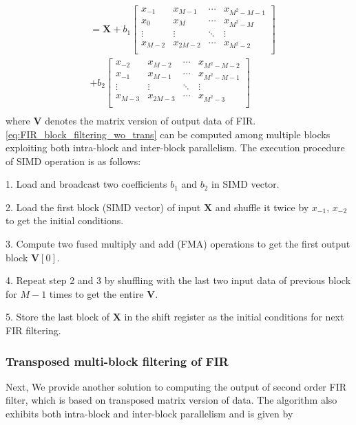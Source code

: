 \begin{equation}
\begin{aligned}
            &= \bm{X} + b_1\left[\begin{array}{c|c|c|c}
                x_{-1} & x_{M-1} & \cdots & x_{M^2-M-1} \\ 
                x_0 & x_M & \cdots & x_{M^2-M} \\
                \vdots & \vdots & \ddots & \vdots \\
                x_{M-2} & x_{2M-2} &\cdots & x_{M^2-2} \\
                \end{array}\right]  \\
            &+ b_2\left[\begin{array}{c|c|c|c}
                x_{-2} & x_{M-2} & \cdots & x_{M^2-M-2} \\ 
                x_{-1} & x_{M-1} & \cdots & x_{M^2-M-1} \\
                \vdots & \vdots & \ddots & \vdots \\
                x_{M-3} & x_{2M-3} &\cdots & x_{M^2-3} \\
                \end{array}\right]  \\
    \end{aligned}
\end{equation}
where $\bm{V}$ denotes the matrix version of output data of FIR.
\eqref{eq:FIR_block_filtering_wo_trans}
can be computed among multiple blocks exploiting both intra-block and inter-block parallelism. The execution
procedure of SIMD operation is as follows:

1. Load and broadcast two coefficients $b_1$ and $b_2$ in SIMD vector.

2. Load the first block (SIMD vector) of input $\bm{X}$ and shuffle it twice by $x_{-1}$, $x_{-2}$ to get
the initial conditions. 

3. Compute two fused multiply and add (FMA) operations to get the first output block $\bm{V}[0]$.

4. Repeat step 2 and 3 by shuffling with the last two input data of previous block for $M{-}1$ times 
to get the entire $\bm{V}$.

5. Store the last block of $\bm{X}$ in the shift register as the initial conditions for next FIR filtering.

\subsubsection{Transposed multi-block filtering of FIR}
Next, We provide another solution to computing the output of second order FIR filter, which is based on transposed
matrix version of data. The algorithm also exhibits both intra-block and inter-block parallelism and is given by

